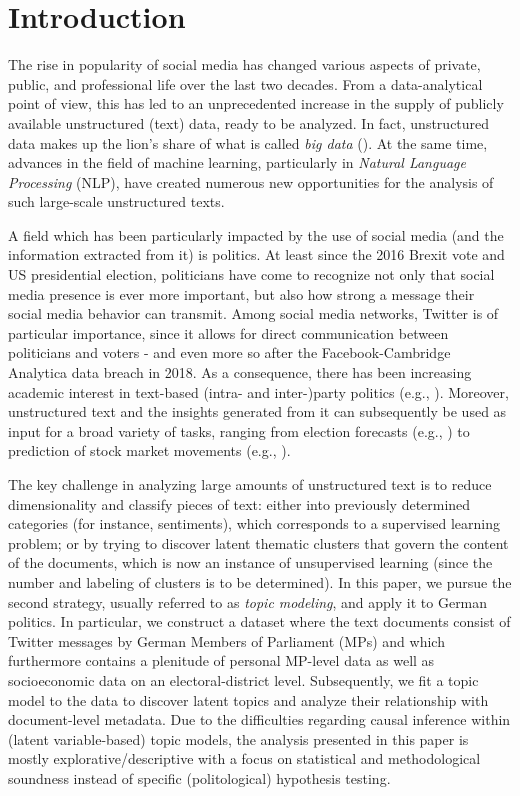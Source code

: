 \section{Introduction}

The rise in popularity of social media has changed various aspects of private, public, and professional life over the last two decades. From a data-analytical point of view, this has led to an unprecedented increase in the supply of publicly available unstructured (text) data, ready to be analyzed. In fact, unstructured data makes up the lion's share of what is called \textit{big data} (\citealp{gandomi2015beyond}). At the same time, advances in the field of machine learning, particularly in \textit{Natural Language Processing} (NLP), have created numerous new opportunities for the analysis of such large-scale unstructured texts.

A field which has been particularly impacted by the use of social media (and the information extracted from it) is politics. At least since the 2016 Brexit vote and US presidential election, politicians have come to recognize not only that social media presence is ever more important, but also how strong a message their social media behavior can transmit. Among social media networks, Twitter is of particular importance, since it allows for direct communication between politicians and voters - and even more so after the Facebook-Cambridge Analytica data breach in 2018. As a consequence, there has been increasing academic interest in text-based (intra- and inter-)party politics (e.g., \citealp{ceron2017intra, daniel2019static, grimmer2010bayesian, quinlan2018show}). Moreover, unstructured text and the insights generated from it can subsequently be used as input for a broad variety of tasks, ranging from election forecasts (e.g., \citealp{burnap2016140, jungherr2016twitter, tumasjan2010predicting}) to prediction of stock market movements (e.g., \citealp{nisar2018twitter}).

The key challenge in analyzing large amounts of unstructured text is to reduce dimensionality and classify pieces of text: either into previously determined categories (for instance, sentiments), which corresponds to a supervised learning problem; or by trying to discover latent thematic clusters that govern the content of the documents, which is now an instance of unsupervised learning (since the number and labeling of clusters is to be determined). In this paper, we pursue the second strategy, usually referred to as \textit{topic modeling}, and apply it to German politics. In particular, we construct a dataset where the text documents consist of Twitter messages by German Members of Parliament (MPs) and which furthermore contains a plenitude of personal MP-level data as well as socioeconomic data on an electoral-district level. Subsequently, we fit a topic model to the data to discover latent topics and analyze their relationship with document-level metadata. Due to the difficulties regarding causal inference within (latent variable-based) topic models, the analysis presented in this paper is mostly explorative/descriptive with a focus on statistical and methodological soundness instead of specific (politological) hypothesis testing.

